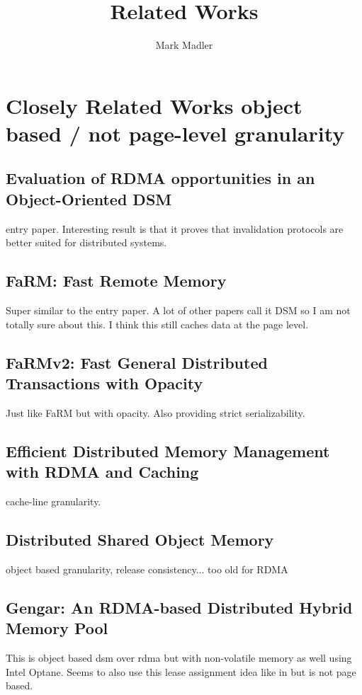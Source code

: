 \documentclass[sigplan,nonacm]{acmart}
\title{Related Works}
\author{Mark Madler}
\begin{document}
\maketitle
\section{Closely Related Works object based / not page-level granularity}
\subsection{Evaluation of RDMA opportunities in an Object-Oriented DSM}
entry paper. Interesting result is that it proves that invalidation protocols are better suited 
for distributed systems. \cite{Veldema-LCPC-2007}

\subsection{FaRM: Fast Remote Memory}
Super similar to the entry paper. A lot of other papers call it DSM so 
I am not totally sure about this. I think this still caches data at the page level.\cite{Dragojevic-NSDI-2014}

\subsection{FaRMv2: Fast General Distributed Transactions with Opacity}
Just like FaRM but with opacity. Also providing strict serializability.\cite{Shamis-SIGMOD-2019}

\subsection{Efficient Distributed Memory Management with RDMA and Caching }
cache-line granularity.\cite{Cai-VLDB-2018}

\subsection{Distributed Shared Object Memory}
object based granularity, release consistency... too old for RDMA\cite{Guedes-WWOSIII-1993}

\subsection{Gengar: An RDMA-based Distributed Hybrid Memory Pool}
This is object based dsm over rdma but with non-volatile memory as well using Intel Optane. Seems to 
also use this lease assignment idea like in \cite{Endo-IPDRM-2020} but is not page based.\cite{Duan-ICDCS-2021}
\end{document}
